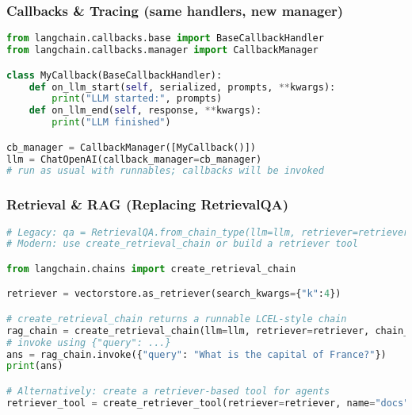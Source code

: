 \begin{frame}[fragile]\frametitle{Callbacks \& Tracing (same handlers, new manager)}
\begin{lstlisting}[language=python,basicstyle=\tiny]
from langchain.callbacks.base import BaseCallbackHandler
from langchain.callbacks.manager import CallbackManager

class MyCallback(BaseCallbackHandler):
    def on_llm_start(self, serialized, prompts, **kwargs):
        print("LLM started:", prompts)
    def on_llm_end(self, response, **kwargs):
        print("LLM finished")

cb_manager = CallbackManager([MyCallback()])
llm = ChatOpenAI(callback_manager=cb_manager)
# run as usual with runnables; callbacks will be invoked
\end{lstlisting}
\end{frame}

\begin{frame}[fragile]\frametitle{Local \& HF Models (examples kept)]
\begin{lstlisting}[language=python,basicstyle=\tiny]
# HuggingFace Pipeline (local)
from langchain.llms import HuggingFacePipeline
from transformers import AutoTokenizer, AutoModelForCausalLM, pipeline

model_id = "gpt2"
tokenizer = AutoTokenizer.from_pretrained(model_id)
model = AutoModelForCausalLM.from_pretrained(model_id)
pipe = pipeline("text-generation", model=model, tokenizer=tokenizer)
llm_local = HuggingFacePipeline(pipeline=pipe)

# Use as any other llm runnable:
prompt = PromptTemplate(input_variables=["q"], template="{q}")
resp = (prompt | llm_local).invoke({"q": "Write a haiku about code."})
\end{lstlisting}
\end{frame}

\begin{frame}[fragile]\frametitle{Retrieval \& RAG (Replacing RetrievalQA)}
\begin{lstlisting}[language=python,basicstyle=\tiny]
# Legacy: qa = RetrievalQA.from_chain_type(llm=llm, retriever=retriever)
# Modern: use create_retrieval_chain or build a retriever tool

from langchain.chains import create_retrieval_chain

retriever = vectorstore.as_retriever(search_kwargs={"k":4})

# create_retrieval_chain returns a runnable LCEL-style chain
rag_chain = create_retrieval_chain(llm=llm, retriever=retriever, chain_type="stuff")
# invoke using {"query": ...}
ans = rag_chain.invoke({"query": "What is the capital of France?"})
print(ans)

# Alternatively: create a retriever-based tool for agents
retriever_tool = create_retriever_tool(retriever=retriever, name="docs", description="Useful for answering questions from the docs")
\end{lstlisting}
\end{frame}


